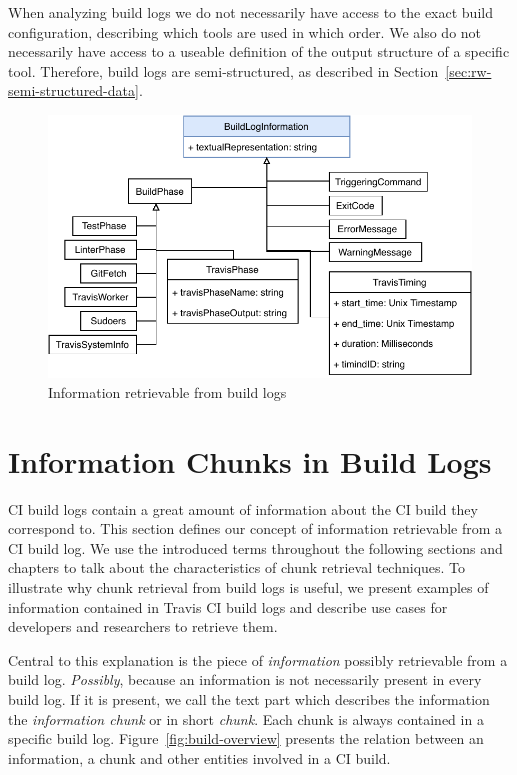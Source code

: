 \documentclass[\myrootdir/main.tex]{subfiles}
\begin{document}
When analyzing build logs we do not necessarily have access to the exact build configuration, describing which tools are used in which order.
We also do not necessarily have access to a useable definition of the output structure of a specific tool.
Therefore, build logs are semi-structured, as described in Section~\ref{sec:rw-semi-structured-data}.

\begin{figure}[htbp]
	\centering
	\includegraphics[width=\textwidth, clip]{img/build-log-information.pdf}
	\caption{Information retrievable from build logs}
	\label{fig:build-log-information}
\end{figure}

\section{Information Chunks in Build Logs}
\label{sec:bli}
CI build logs contain a great amount of information about the CI build they correspond to.
This section defines our concept of information retrievable from a CI build log.
We use the introduced terms throughout the following sections and chapters to talk about the characteristics of chunk retrieval techniques.
To illustrate why chunk retrieval from build logs is useful, we present examples of information contained in Travis CI build logs and describe use cases for developers and researchers to retrieve them.

Central to this explanation is the piece of \emph{information} possibly retrievable from a build log.
\emph{Possibly}, because an information is not necessarily present in every build log.
If it is present, we call the text part which describes the information the \emph{information chunk} or in short \emph{chunk}.
Each chunk is always contained in a specific build log.
Figure~\ref{fig:build-overview} presents the relation between an information, a chunk and other entities involved in a CI build.
\end{document}
